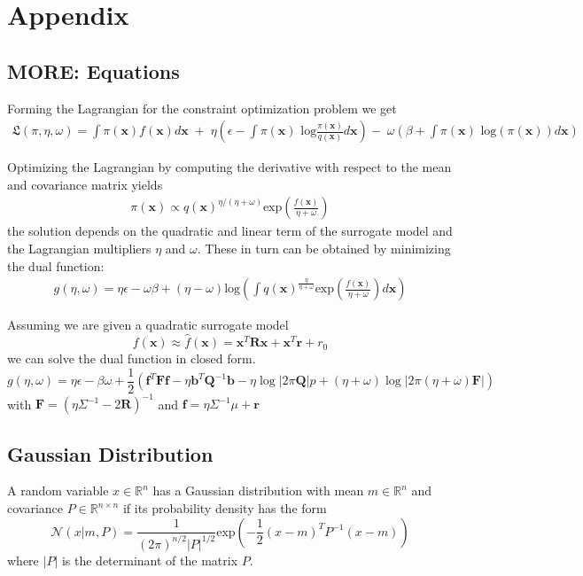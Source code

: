 
\chapter{Appendix}

\section{MORE: Equations}\label{more_appendix}
Forming the Lagrangian for the constraint optimization problem we get
\begin{align*} \mathfrak{L}(\pi, \eta, \omega) = 
\int \pi(\mathbf{x}) f(\mathbf{x}) d\mathbf{x} \; + \; 
\eta  \left(\epsilon - \int \pi(\mathbf{x}) \text{ log}
 \frac{\pi(\mathbf{x})}{q(\mathbf{x})} d\mathbf{x}\right)
 - \; \omega \left(\beta + \int \pi(\mathbf{x}) \text{ log}(\pi(\mathbf{x})) d\mathbf{x}\right)
\end{align*}

Optimizing the Lagrangian by computing the derivative with respect
to the mean and covariance matrix yields
\begin{align*}
\pi(\mathbf{x}) \propto q(\mathbf{x})^{\eta/(\eta+\omega)} 
\text{exp}\left(\frac{f(\mathbf{x})}{\eta + \omega}\right)
\end{align*}
the solution depends on the quadratic and linear term
of the surrogate model and the
Lagrangian multipliers
$\eta$ and $\omega$. These in turn can be obtained by
minimizing the dual function:
\begin{align}
  \label{eq:dual}
  g(\eta,\omega) = \eta\epsilon - \omega\beta + (\eta - \omega) \text{log}
\left(\int q(\mathbf{x})^{\frac{\eta}{\eta + \omega}}
  \text{exp}\left(\frac{f(\mathbf{x})}{\eta + \omega}\right) d\mathbf{x} \right)
\end{align}

Assuming we are given a quadratic surrogate model
$$ f(\mathbf{x}) \approx \hat{f}(\mathbf{x}) = \mathbf{x}^T \mathbf{R} \mathbf{x} + \mathbf{x}^T \mathbf{r} + r_0 $$
we can solve the dual function in closed form.
$$ g(\eta, \omega) = \eta \epsilon - \beta \omega
+ \frac{1}{2} \left(\mathbf{f}^T \mathbf{F} \mathbf{f}
  - \eta \mathbf{b}^T \mathbf{Q}^{-1}
  \mathbf{b} - \eta \log |2\pi \mathbf{Q}|p
  + (\eta + \omega) \log |2\pi (\eta + \omega)
\mathbf{F}| \right) $$
with $\mathbf{F} = (\eta \Sigma^{-1} - 2 \mathbf{R})^{-1}$ and
$\mathbf{f} = \eta \Sigma^{-1} \mu + \mathbf{r}$


\section{Gaussian Distribution}\label{gauss_pdf}
A random variable $x \in \mathbb{R}^n$ has a Gaussian distribution with mean
$m \in \mathbb{R}^n$ and covariance $P \in \mathbb{R}^{n\times n}$ if its
probability density has the form
$$ \mathcal{N}(x | m, P) = \frac{1}{(2\pi)^{n / 2} |P|^{1/2}}
\text{exp} \left( -\frac{1}{2} (x - m)^T P^{-1} (x-m) \right) $$
where $|P|$ is the determinant of the matrix $P$.

